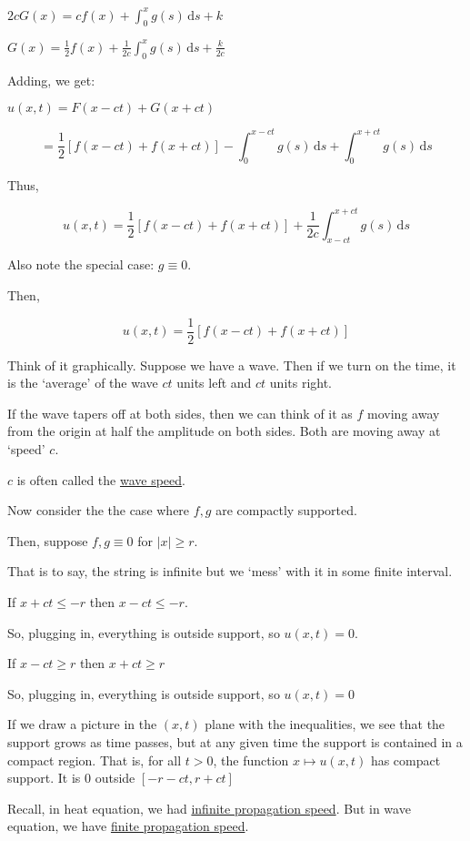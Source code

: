\documentclass{article}
\theoremstyle{definition}
\begin{document}
\(2cG(x) = cf(x) + \int_0^x g(s)\,\mathrm{d} s + k\) 

\(G(x) = \frac{1}{2}f(x) + \frac{1}{2c}\int_0^x g(s)\,\mathrm{d} s + \frac{k}{2c}\) 

Adding, we get:

\(u(x,t)=F(x-ct)+G(x+ct)\)

\[
    =\frac{1}{2}\left[ f(x-ct) + f(x+ct) \right] - \int_{0}^{x-ct} g(s) \,\mathrm{d}s + \int_{0}^{x+ct} g(s) \,\mathrm{d}s
\]

Thus,

\[
    u(x,t) = \boxed{ \frac{1}{2}\left[ f(x-ct) + f(x+ct) \right] + \frac{1}{2c} \int_{x - ct}^{x + ct} g(s) \,\mathrm{d}s  }
\]

Also note the special case: \(g \equiv 0\).

Then,

\[
    u(x,t) = \frac{1}{2}\left[ f(x - ct) + f(x + ct) \right] 
\]

Think of it graphically. Suppose we have a wave. Then if we turn on the time, it is the `average' of the wave \(ct\) units left and \(ct\) units right.

If the wave tapers off at both sides, then we can think of it as \(f\) moving away from the origin at half the amplitude on both sides. Both are moving away at `speed' \(c\).

\(c\) is often called the \underline{wave speed}.

Now consider the the case where \(f,g\) are compactly supported.

Then, suppose \(f,g \equiv 0\) for \(\vert x \vert \geq r\).

That is to say, the string is infinite but we `mess' with it in some finite interval.

If \(x + ct \leq - r\) then \(x - ct \leq -r\).

So, plugging in, everything is outside support, so \(u(x,t) = 0\).

If \(x - ct \geq r\) then \(x + ct \geq r\) 

So, plugging in, everything is outside support, so \(u(x,t) = 0\) 

If we draw a picture in the \((x,t)\) plane with the inequalities, we see that the support grows as time passes, but at any given time the support is contained in a compact region. That is, for all \(t > 0\), the function \(x \mapsto u(x,t)\) has compact support. It is \(0\) outside \([- r - ct, r + ct]\) 

Recall, in heat equation, we had \underline{infinite propagation speed}. But in wave equation, we have \underline{finite propagation speed}.
\end{document}
